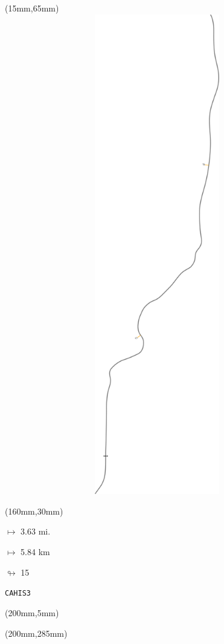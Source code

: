 \begin{textblock*}{185mm}(15mm,65mm)%
\centering
\mbox{\includegraphics[width=185mm,height=210mm,keepaspectratio]{PT/CAHIS3.pdf}}
\end{textblock*}
\begin{textblock*}{40mm}(160mm,30mm)%
\Large
\par$\mapsto$ 3.63 mi.
\par$\mapsto$ 5.84 km
\par$\looparrowright$ 15
\par\hfill\tiny\tt CAHIS3\\
\end{textblock*}
\begin{textblock*}{20mm}(200mm,5mm)%
\fbox{\thepage}
\label{CAHIS3}
\end{textblock*}
\begin{textblock*}{20mm}(200mm,285mm)%
\fbox{\thepage}
\end{textblock*}

